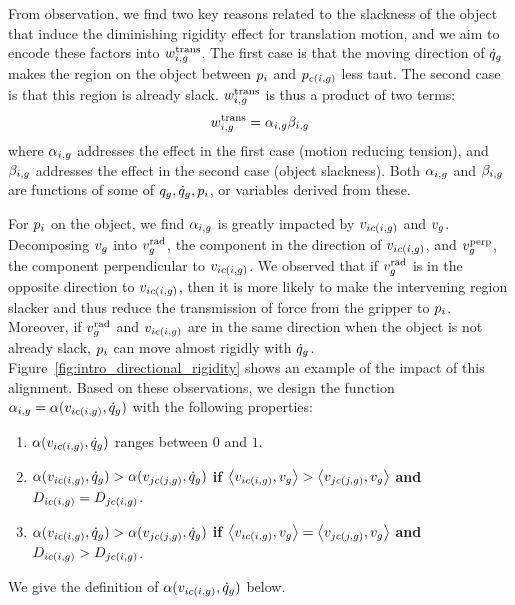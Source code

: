 From observation, we find two key reasons related to the slackness of the object that induce the diminishing rigidity effect for translation motion, and we aim to encode these factors into $w^{\textrm{trans}}_{i, g}$. The first case is that the moving direction of $\dot{q}_g$ makes the region on the object between $p_i$ and $p_{c(i, g)}$ less taut. The second case is that this region is already slack. $w^{\textrm{trans}}_{i, g}$ is thus a product of two terms:
\begin{equation}
    w^{\textrm{trans}}_{i, g} = \alpha_{i, g} \beta_{i, g}
    \label{eq:Combined_directional_rigidity}
\end{equation}
where $\alpha_{i, g}$ addresses the effect in the first case (motion reducing tension), and $\beta_{i, g}$ addresses the effect in the second case (object slackness). Both $\alpha_{i, g}$ and $\beta_{i, g}$ are functions of some of $q_g, \dot{q}_g, p_i$, or variables derived from these.

For $p_i$ on the object, we find $\alpha_{i, g}$ is greatly impacted by $v_{i c(i, g)}$ and $v_g$. Decomposing $v_g$ into $v_g^{\textrm{rad}}$, the component in the direction of $v_{i c(i, g)}$, and $v_g^{\textrm{perp}}$, the component perpendicular to $v_{i c(i, g)}$. We observed that if $v_g^{\textrm{rad}}$ is in the opposite direction to $v_{i c(i, g)}$, then it is more likely to make the intervening region slacker and thus reduce the transmission of force from the gripper to $p_i$. Moreover, if $v_g^{\textrm{rad}}$ and $v_{i c(i, g)}$ are in the same direction when the object is not already slack, $p_i$ can move almost rigidly with $\dot{q}_g$. Figure~\ref{fig:intro_directional_rigidity} shows an example of the impact of this alignment. Based on these observations, we design the function $\alpha_{i, g} = \alpha(v_{i c(i, g)}, \dot{q}_g)$ with the following properties:
\begin{enumerate}
    \item $\alpha(v_{i c(i, g)}, \dot{q}_g)$ ranges between $0$ and $1$.
    \item $\alpha(v_{i c(i, g)}, \dot{q}_g) > \alpha(v_{j c(j, g)}, \dot{q}_g)$
        \textbf{if} $\left \langle v_{i c(i, g)}, v_g \right \rangle > \left \langle v_{j c(j, g)}, v_g \right \rangle$
        \textbf{and} $D_{i c(i, g)} = D_{j c(i, g)}$.
    \item $\alpha(v_{i c(i, g)}, \dot{q}_g) > \alpha(v_{j c(j, g)}, \dot{q}_g)$
        \textbf{if} $\left \langle v_{i c(i, g)}, v_g \right \rangle = \left \langle v_{j c(j, g)}, v_g \right \rangle$
        \textbf{and} $D_{i c(i, g)} > D_{j c(i, g)}$.
\end{enumerate}
We give the definition of $\alpha(v_{i c(i, g)}, \dot{q}_g)$ below.


